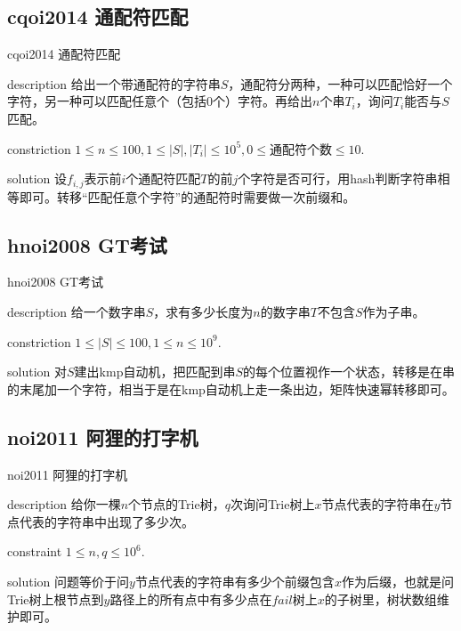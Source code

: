 \documentclass{beamer}
\begin{document}
\subsection{cqoi2014 通配符匹配}
\begin{frame}{cqoi2014 通配符匹配}
	\begin{block}{description}
		给出一个带通配符的字符串$S$，通配符分两种，一种可以匹配恰好一个字符，另一种可以匹配任意个（包括$0$个）字符。再给出$n$个串$T_i$，询问$T_i$能否与$S$匹配。
	\end{block}
	\begin{block}{constriction}
		$1 \le n \le 100, 1 \le |S|,|T_i| \le 10^5, 0 \le $通配符个数$\le 10.$
	\end{block}
	\pause
	\begin{block}{solution}
		设$f_{i,j}$表示前$i$个通配符匹配$T$的前$j$个字符是否可行，用hash判断字符串相等即可。转移“匹配任意个字符”的通配符时需要做一次前缀和。
	\end{block}
\end{frame}
\subsection{hnoi2008 GT考试}
\begin{frame}{hnoi2008 GT考试}
	\begin{block}{description}
		给一个数字串$S$，求有多少长度为$n$的数字串$T$不包含$S$作为子串。
	\end{block}
	\begin{block}{constriction}
		$1 \le |S| \le 100, 1 \le n \le 10^9.$
	\end{block}
	\pause
	\begin{block}{solution}
		对$S$建出kmp自动机，把匹配到串$S$的每个位置视作一个状态，转移是在串的末尾加一个字符，相当于是在kmp自动机上走一条出边，矩阵快速幂转移即可。
	\end{block}
\end{frame}
\subsection{noi2011 阿狸的打字机}
\begin{frame}{noi2011 阿狸的打字机}
	\begin{block}{description}
		给你一棵$n$个节点的Trie树，$q$次询问Trie树上$x$节点代表的字符串在$y$节点代表的字符串中出现了多少次。
	\end{block}
	\begin{block}{constraint}
		$1 \le n, q \le 10^6.$
	\end{block}
	\pause
	\begin{block}{solution}
		问题等价于问$y$节点代表的字符串有多少个前缀包含$x$作为后缀，也就是问Trie树上根节点到$y$路径上的所有点中有多少点在$fail$树上$x$的子树里，树状数组维护即可。
	\end{block}
\end{frame}
\end{document}
